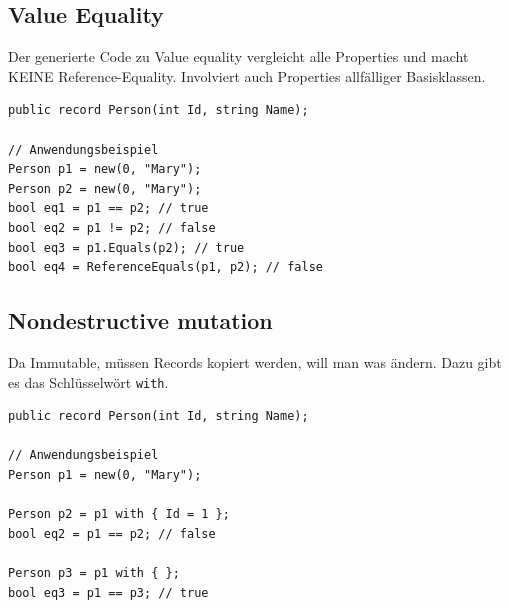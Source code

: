 \documentclass[
a4paper,
oneside,
10pt,
fleqn,
headsepline,
toc=listofnumbered, 
bibliography=totocnumbered]{scrartcl}
\begin{document}
\subsection{Value Equality}
Der generierte Code zu Value equality vergleicht alle Properties und macht KEINE Reference-Equality. Involviert auch Properties allfälliger Basisklassen.
\begin{lstlisting}
public record Person(int Id, string Name);

// Anwendungsbeispiel
Person p1 = new(0, "Mary");
Person p2 = new(0, "Mary");
bool eq1 = p1 == p2; // true
bool eq2 = p1 != p2; // false
bool eq3 = p1.Equals(p2); // true
bool eq4 = ReferenceEquals(p1, p2); // false
\end{lstlisting}

\subsection{Nondestructive mutation}
Da Immutable, müssen Records kopiert werden, will man was ändern. Dazu gibt es das Schlüsselwört \lstinline|with|.
\begin{lstlisting}
public record Person(int Id, string Name);

// Anwendungsbeispiel
Person p1 = new(0, "Mary");

Person p2 = p1 with { Id = 1 };
bool eq2 = p1 == p2; // false

Person p3 = p1 with { };
bool eq3 = p1 == p3; // true
\end{lstlisting}
\end{document}
